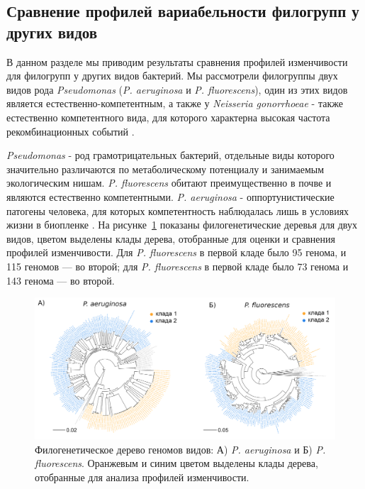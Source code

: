 \subsection{Сравнение профилей вариабельности филогрупп у других видов}

В данном разделе мы приводим результаты сравнения профилей изменчивости для филогрупп у других видов бактерий. Мы рассмотрели филогруппы двух видов рода \textit{Pseudomonas} (\textit{P. aeruginosa} и \textit{P. fluorescens}), один из этих видов является естественно-компетентным, а также у \textit{Neisseria gonorrhoeae} - также естественно компетентного вида, для которого характерна высокая частота рекомбинационных событий \cite{yu2014genome}.

\textit{Pseudomonas} - род грамотрицательных бактерий, отдельные виды которого значительно различаются по метаболическому потенциалу и занимаемым экологическим нишам. \textit{P. fluorescens} обитают преимущественно в почве и являются естественно компетентными. \textit{P. aeruginosa} - оппортунистические патогены человека, для которых компетентность наблюдалась лишь в условиях жизни в биопленке \cite{nolan2019pseudomonas}. На рисунке~\ref{img:pseudo_phylogroups} показаны филогенетические деревья для двух видов, цветом выделены клады дерева, отобранные для оценки и сравнения профилей изменчивости. Для \textit{P. fluorescens} в первой кладе было 95 генома, и 115 геномов --- во второй; для \textit{P. fluorescens} в первой кладе было 73 генома и 143 генома --- во второй.

\begin{figure}[!ht] 
  \center
    \includegraphics[width=\textwidth]{Dissertation/images/complexity/pseudo_phylogroups.png}
  \caption{Филогенетическое дерево геномов видов: А) \textit{P. aeruginosa} и Б) \textit{P. fluorescens}. Оранжевым и синим цветом выделены клады дерева, отобранные для анализа профилей изменчивости. }
  \label{img:pseudo_phylogroups} 
\end{figure}

